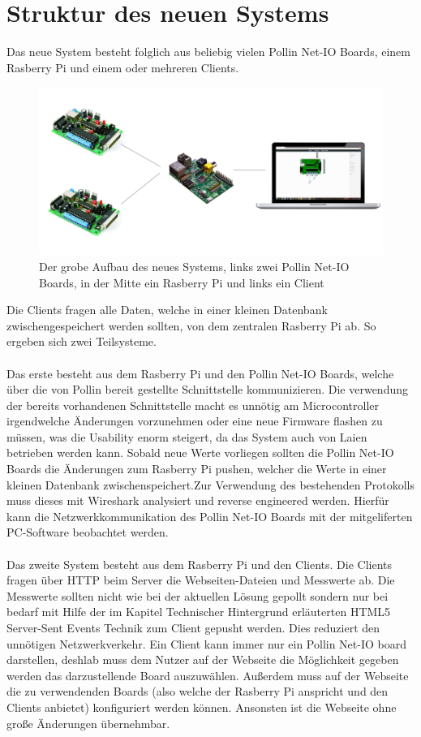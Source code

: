 \section{Struktur des neuen Systems}
Das neue System besteht folglich aus beliebig vielen Pollin Net-IO Boards, einem
Rasberry Pi und einem oder mehreren Clients. 
\begin{figure}[H]
\centering
\includegraphics[width=13cm]{content/pictures/neues_system.png}
\caption{Der grobe Aufbau des neues Systems, links zwei Pollin Net-IO Boards,
in der Mitte ein Rasberry Pi und links ein Client}
\label{struktur}
\end{figure}
Die Clients fragen alle Daten, welche in einer kleinen Datenbank
zwischengespeichert werden sollten, von dem zentralen Rasberry Pi ab. So ergeben
sich zwei Teilsysteme. \\
\\
Das erste besteht aus dem Rasberry Pi und den Pollin Net-IO Boards,
welche über die von Pollin bereit gestellte Schnittstelle kommunizieren.
Die verwendung der bereits vorhandenen Schnittstelle macht es unnötig am
Microcontroller irgendwelche Änderungen vorzunehmen oder eine neue Firmware
flashen zu müssen, was die Usability enorm steigert, da das System auch von
Laien betrieben werden kann. Sobald neue Werte vorliegen sollten die Pollin
Net-IO Boards die Änderungen zum Rasberry Pi pushen, welcher die Werte in einer
kleinen Datenbank zwischenspeichert.Zur Verwendung des bestehenden Protokolls 
muss dieses mit Wireshark analysiert und reverse engineered werden. Hierfür 
kann die Netzwerkkommunikation des Pollin Net-IO Boards mit der mitgeliferten 
PC-Software beobachtet werden.\\
\\
Das zweite System besteht aus dem Rasberry Pi und den Clients. Die Clients
fragen über HTTP beim Server die Webseiten-Dateien und Messwerte ab. Die
Messwerte sollten nicht wie bei der aktuellen Lösung gepollt sondern nur bei
bedarf mit Hilfe der im Kapitel Technischer Hintergrund erläuterten HTML5
Server-Sent Events Technik zum Client gepusht werden. Dies reduziert den
unnötigen Netzwerkverkehr. Ein Client kann immer nur ein Pollin Net-IO board
darstellen, deshlab muss dem Nutzer auf der Webseite die Möglichkeit gegeben
werden das darzustellende Board auszuwählen. Außerdem muss auf der Webseite die
zu verwendenden Boards (also welche der Rasberry Pi anspricht und den Clients
anbietet) konfiguriert werden können. Ansonsten ist die Webseite ohne große
Änderungen übernehmbar.

